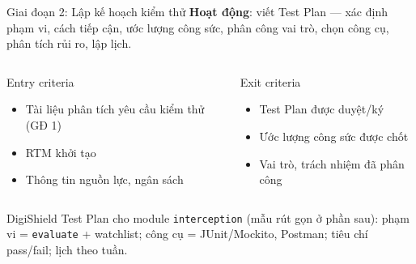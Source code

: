 \documentclass[aspectratio=169,12pt]{beamer}
\begin{document}
\begin{frame}{Giai đoạn 2: Lập kế hoạch kiểm thử}
  \textbf{Hoạt động}: viết Test Plan --- xác định phạm vi, cách tiếp cận, ước lượng
  công sức, phân công vai trò, chọn công cụ, phân tích rủi ro, lập lịch.

  \vspace{0.4em}
  \begin{columns}[T]
    \begin{block}{Entry criteria}
      \begin{itemize}
        \item Tài liệu phân tích yêu cầu kiểm thử (GĐ 1)
        \item RTM khởi tạo
        \item Thông tin nguồn lực, ngân sách
      \end{itemize}
    \end{block}
    \begin{block}{Exit criteria}
      \begin{itemize}
        \item Test Plan được duyệt/ký
        \item Ước lượng công sức được chốt
        \item Vai trò, trách nhiệm đã phân công
      \end{itemize}
    \end{block}
  \end{columns}

  \vspace{0.3em}
  \begin{exampleblock}{\small DigiShield}
    \small Test Plan cho module \texttt{interception} (mẫu rút gọn ở phần sau):
    phạm vi = \texttt{evaluate} + watchlist; công cụ = JUnit/Mockito, Postman;
    tiêu chí pass/fail; lịch theo tuần.
  \end{exampleblock}
\end{frame}
\end{document}
